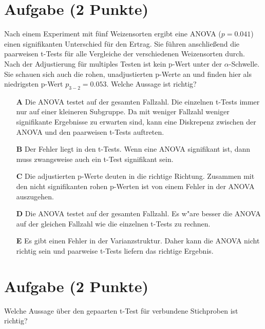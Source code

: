 \documentclass[a4paper, 9pt]{scrartcl}\usepackage[]{graphicx}\usepackage[]{xcolor}
\begin{document}
\section{Aufgabe \hfill (2 Punkte)}

Nach einem Experiment mit f{\"u}nf Weizensorten ergibt eine ANOVA ($p = 0.041$)
einen signifikanten Unterschied f{\"u}r den Ertrag. Sie f{\"u}hren anschlie{\ss}end die
paarweisen t-Tests f{\"u}r alle Vergleiche der verschiedenen Weizensorten
durch. Nach der Adjustierung f{\"u}r multiples Testen ist kein p-Wert unter der
$\alpha$-Schwelle. Sie schauen sich auch die rohen, unadjustierten p-Werte
an und finden hier als niedrigsten p-Wert $p_{3-2} = 0.053$. Welche Aussage
ist richtig? 



\begin{enumerate}
\item [\textbf{A} \msquare] Die ANOVA testet auf der gesamten Fallzahl. Die einzelnen t-Tests immer nur auf einer kleineren Subgruppe. Da mit weniger Fallzahl weniger signifikante Ergebnisse zu erwarten sind, kann eine Diskrepenz zwischen der ANOVA und den paarweisen t-Tests auftreten.
\item [\textbf{B} \msquare] Der Fehler liegt in den t-Tests. Wenn eine ANOVA signifikant ist, dann muss zwangsweise auch ein t-Test signifikant sein.
\item [\textbf{C} \msquare] Die adjustierten p-Werte deuten in die richtige Richtung. Zusammen mit den nicht signifikanten rohen p-Werten ist von einem Fehler in der ANOVA auszugehen.
\item [\textbf{D} \msquare] Die ANOVA testet auf der gesamten Fallzahl. Es w{"a}re besser die ANOVA auf der gleichen Fallzahl wie die einzelnen t-Tests zu rechnen.
\item [\textbf{E} \msquare] Es gibt einen Fehler in der Varianzstruktur. Daher kann die ANOVA nicht richtig sein und paarweise t-Tests liefern das richtige Ergebnis.
\end{enumerate}

\section{Aufgabe \hfill (2 Punkte)}

Welche Aussage {\"u}ber den gepaarten t-Test f{\"u}r verbundene Stichproben ist richtig?
\end{document}
